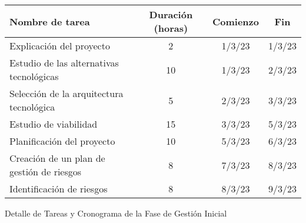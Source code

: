 \begin{planificacion}
	\centering
	\begin{tabular}{ | m{9cm} | c | c | c |}
		\hline
		\textbf{Nombre de tarea}                  & \textbf{Duración (horas)} & \textbf{Comienzo} & \textbf{Fin} \\
		\hline
		Explicación del proyecto                  & 2                         & 1/3/23            & 1/3/23       \\
		\hline
		Estudio de las alternativas tecnológicas  & 10                        & 1/3/23            & 2/3/23       \\
		\hline
		Selección de la arquitectura tecnológica  & 5                         & 2/3/23            & 3/3/23       \\
		\hline
		Estudio de viabilidad                     & 15                        & 3/3/23            & 5/3/23       \\
		\hline
		Planificación del proyecto                & 10                        & 5/3/23            & 6/3/23       \\
		\hline
		Creación de un plan de gestión de riesgos & 8                         & 7/3/23            & 8/3/23       \\
		\hline
		Identificación de riesgos                 & 8                         & 8/3/23            & 9/3/23       \\
		\hline
	\end{tabular}
	\caption{Detalle de Tareas y Cronograma de la Fase de Gestión Inicial}
\end{planificacion}
